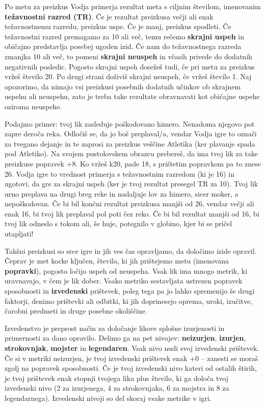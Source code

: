 Po metu za preizkus Vodja primerja rezultat meta s ciljnim številom, imenovanim \textbf{težavnostni razred (TR)}. Če je rezultat preizkusa večji ali enak težavnostnemu razredu, preizkus uspe. Če je manj, preizkus spodleti. Če težavnostni razred premagamo za 10 ali več, temu rečemo \textbf{skrajni uspeh} in običajno predstavlja posebej ugoden izid. Če nam do težavnostnega razreda zmanjka 10 ali več, to pomeni \textbf{skrajni neuspeh} in včasih privede do dodatnih negativnih posledic. Pogosto skrajni uspeh dosežeš tudi, če pri metu za preizkus vržeš število 20. Po drugi strani doživiš skrajni neuspeh, če vržeš število 1. Naj opozorimo, da nimajo vsi preizkusi posebnih dodatnih učinkov ob skrajnem uspehu ali neuspehu, zato je treba take rezultate obravnavati kot običajne uspehe oziroma neuspehe.

Podajmo primer: tvoj lik zasleduje poškodovano himero. Nenadoma njegovo pot zapre deroča reka. Odločiš se, da jo boš preplaval/a, vendar Vodja igre to označi za tvegano dejanje in te zaprosi za preizkus veščine Atletika (ker plavanje spada pod Atletiko). Na svojem pustolovskem obrazcu prebereš, da ima tvoj lik za take preizkuse popravek +8. Ko vržeš k20, pade 18, s prištetim popravkom pa to znese 26. Vodja igre to vrednost primerja s težavnostnim razredom (ki je 16) in ugotovi, da gre za skrajni uspeh (ker je tvoj rezultat presegel TR za 10). Tvoj lik urno preplava na drugi breg reke in nadaljuje lov za himero, sicer moker, a nepoškodovan. Če bi bil končni rezultat preizkusa manjši od 26, vendar večji ali enak 16, bi tvoj lik preplaval pol poti čez reko. Če bi bil rezultat manjši od 16, bi tvoj lik odneslo s tokom ali, še huje, potegnilo v globino, kjer bi se pričel utapljati!

Takšni preizkusi so srce igre in jih ves čas opravljamo, da določimo izide opravil. Čeprav je met kocke ključen, števila, ki jih prištejemo metu (imenovana \textbf{popravki}), pogosto ločijo uspeh od neuspeha. Vsak lik ima mnogo metrik, ki uravnavajo, v čem je lik dober. Vsako metriko sestavljata ustrezen popravek sposobnosti in \textbf{izvedenski} prištevek, poleg tega pa jo lahko spremenijo še drugi faktorji, denimo prištevki ali odbitki, ki jih doprinesejo oprema, uroki, izučitve, čarobni predmeti in druge posebne okoliščine.

Izvedenstvo je preprost način za določanje likove splošne izurjenosti in primernosti za dano opravilo. Delimo ga na pet nivojev: \textbf{neizurjen}, \textbf{izurjen}, \textbf{strokovnjak}, \textbf{mojster} in \textbf{legendaren}. Vsak nivo nudi svoj izvedenski prištevek. Če si v metriki neizurjen, je tvoj izvedenski prištevek enak +0 -- zanesti se moraš zgolj na popravek sposobnosti. Če je tvoj izvedenski nivo kateri od ostalih štirih, je tvoj prištevek enak stopnji tvojega lika plus število, ki ga določa tvoj izvedenski nivo (2 za izurjenega, 4 za strokovnjaka, 6 za mojstra in 8 za legendarnega). Izvedenski nivoji so del skoraj vsake metrike v igri.

